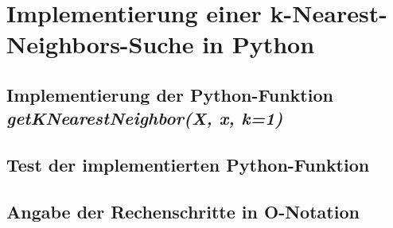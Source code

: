 \section{Implementierung einer k-Nearest-Neighbors-Suche in Python}


\subsection{
    Implementierung der Python-Funktion \textit{getKNearestNeighbor(X, x, k=1)}
}


\subsection{Test der implementierten Python-Funktion}



\subsection{Angabe der Rechenschritte in O-Notation}